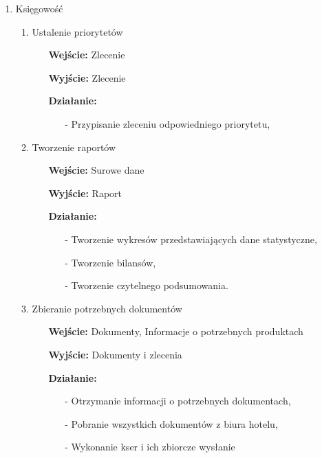 \documentclass[a4paper, 11pt]{article}
\begin{document}
\begin{enumerate}[label*=\arabic*.]
\begin{enumerate}[label*=\arabic*.]
\begin{itemize}
\begin{itemize}
				\end{itemize}
			\end{itemize}
		\end{enumerate}	
		\item Księgowość
		\begin{enumerate}[label*=\arabic*.]
			\item Ustalenie priorytetów
			\begin{itemize}
				\item [\textbf{Wejście:}] Zlecenie
				\item [\textbf{Wyjście:}] Zlecenie
				\item [\textbf{Działanie:}] 
				\begin{itemize}
					\item[-] Przypisanie zleceniu odpowiedniego priorytetu,
				\end{itemize}
			\end{itemize}
			\item Tworzenie raportów
			\begin{itemize}
				\item [\textbf{Wejście:}] Surowe dane
				\item [\textbf{Wyjście:}] Raport
				\item [\textbf{Działanie:}] 
				\begin{itemize}
					\item[-] Tworzenie wykresów przedstawiających dane statystyczne,
					\item[-] Tworzenie bilansów,
					\item[-] Tworzenie czytelnego podsumowania.
				\end{itemize}
			\end{itemize}
			\item Zbieranie potrzebnych dokumentów			
			\begin{itemize}
				\item [\textbf{Wejście:}] Dokumenty, Informacje o potrzebnych produktach
				\item [\textbf{Wyjście:}] Dokumenty i zlecenia
				\item [\textbf{Działanie:}] 
				\begin{itemize}
					\item[-] Otrzymanie informacji o potrzebnych dokumentach,
					\item[-] Pobranie wszystkich dokumentów z biura hotelu,
					\item[-] Wykonanie kser i ich zbiorcze wysłanie
				\end{itemize}
			\end{itemize}
		\end{enumerate}	
	\end{enumerate}
	
	
	
	
		
\end{document}

